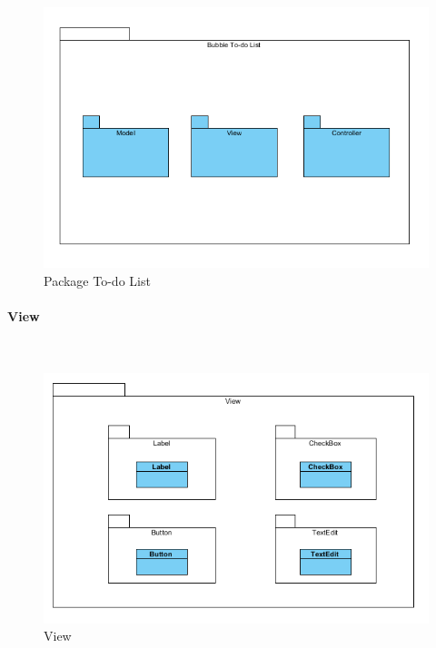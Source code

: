 \begin{figure}[H]
	\centering
	\includegraphics[width=14cm]{../../documenti/SpecificaTecnica/diagrammi_img/classi_e_package/todo.png}
	\caption{Package To-do List}
\end{figure}

\begin{samepage}
\paragraph{View}\mbox{}\\
\nopagebreak
\begin{figure}[H]
	\centering
	\includegraphics[width=14cm]{../../documenti/SpecificaTecnica/diagrammi_img/classi_e_package/todo_view.png}
	\caption{View}
\end{figure}
\end{samepage}

